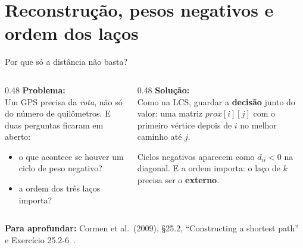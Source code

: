 \documentclass[aspectratio=169,xcolor=table]{beamer}
\newcommand{\fonte}[1]{%
  \vfill
  {\tiny\color{gray!55!black}\textbf{Para aprofundar:} #1\par}%
}
\begin{document}
\section{Reconstrução, pesos negativos e ordem dos laços}

\begin{frame}{Por que só a distância não basta?}
  \begin{columns}[T]
    \begin{column}{0.48\textwidth}
      \textbf{Problema:}\\[2pt]
      \scriptsize Um GPS precisa da \emph{rota}, não só do número de quilômetros. E duas
      perguntas ficaram em aberto:
      \begin{itemize}\scriptsize
        \item o que acontece se houver um ciclo de peso negativo?
        \item a ordem dos três laços importa?
      \end{itemize}
    \end{column}
    \begin{column}{0.48\textwidth}
      \textbf{Solução:}\\[2pt]
      \scriptsize Como na LCS, guardar a \textbf{decisão} junto do valor: uma matriz
      $\mathit{prox}[i][j]$ com o primeiro vértice depois de $i$ no melhor caminho até $j$.
      \medskip

      Ciclos negativos aparecem como $d_{ii} < 0$ na diagonal. E a ordem importa: o laço de
      $k$ precisa ser o \textbf{externo}.
    \end{column}
  \end{columns}
  \fonte{Cormen et al.\ (2009), \S 25.2, ``Constructing a shortest path'' e Exercício
    25.2-6~\cite{cormen2009introduction}.}
\end{frame}
\end{document}
